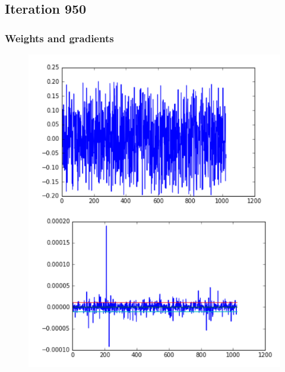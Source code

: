 \subsection{Iteration 950}
\begin{frame}
    \frametitle{Weights and gradients}
    \begin{figure}
		\includegraphics[scale=0.3]{figure/951-1.PNG}
    \end{figure}
\end{frame}
